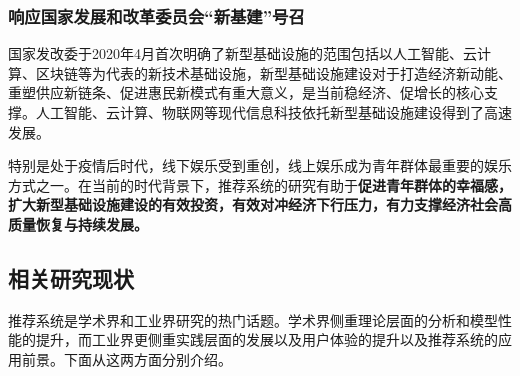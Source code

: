 \documentclass[withoutpreface,bwprint]{cumcmthesis} %
\begin{document}
	\subsubsection{ 响应国家发展和改革委员会“新基建”号召}
	国家发改委于2020年4月首次明确了新型基础设施的范围包括以人工智能、云计算、区块链等为代表的新技术基础设施，新型基础设施建设对于打造经济新动能、重塑供应新链条、促进惠民新模式有重大意义，是当前稳经济、促增长的核心支撑。人工智能、云计算、物联网等现代信息科技依托新型基础设施建设得到了高速发展。\par
	特别是处于疫情后时代，线下娱乐受到重创，线上娱乐成为青年群体最重要的娱乐方式之一。在当前的时代背景下，推荐系统的研究有助于\textbf{促进青年群体的幸福感，扩大新型基础设施建设的有效投资，有效对冲经济下行压力，有力支撑经济社会高质量恢复与持续发展。}
	\subsection{相关研究现状}
	推荐系统是学术界和工业界研究的热门话题。学术界侧重理论层面的分析和模型性能的提升，而工业界更侧重实践层面的发展以及用户体验的提升以及推荐系统的应用前景。下面从这两方面分别介绍。
\end{document}
